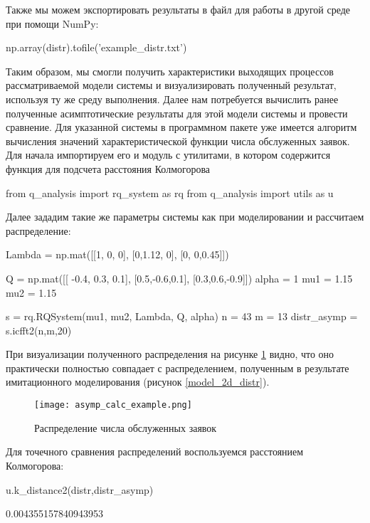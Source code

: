 Также мы можем экспортировать результаты в файл для работы в другой среде при помощи NumPy:
\begin{pyin} [rqtestchar]
np.array(distr).tofile('example_distr.txt')
\end{pyin}
Таким образом, мы смогли получить характеристики выходящих процессов рассматриваемой модели системы и визуализировать полученный результат, используя ту же среду выполнения. Далее нам потребуется вычислить ранее полученные асимптотические результаты для этой модели системы и провести сравнение. Для указанной системы в программном пакете уже имеется алгоритм вычисления значений характеристической функции числа обслуженных заявок. Для начала импортируем его и модуль с утилитами, в котором содержится функция для подсчета расстояния Колмогорова

\begin{pyin} 
from q_analysis import rq_system as rq
from q_analysis import utils as u
\end{pyin}

Далее зададим такие же параметры системы как при моделировании и рассчитаем распределение:

\begin{pyin} 
Lambda = np.mat([[1, 0,   0],
[0,1.12, 0],
[0, 0,0.45]])

Q = np.mat([[ -0.4, 0.3, 0.1],
[0.5,-0.6,0.1],
[0.3,0.6,-0.9]])
alpha = 1
mu1 = 1.15
mu2 = 1.15

s = rq.RQSystem(mu1, mu2, Lambda, Q, alpha)
n = 43
m = 13
distr_asymp =    s.icfft2(n,m,20)
\end{pyin}

При визуализации полученного распределения на рисунке \ref{asymp_calc_example} видно, что оно практически полностью совпадает с распределением, полученным в результате имитационного моделирования (рисунок \ref{model_2d_distr}).

\begin{figure}[H]
	\centering
	\texttt{[image: asymp\_calc\_example.png]}
	\caption{Распределение числа обслуженных заявок} 
	\label{asymp_calc_example}
\end{figure}

Для точечного сравнения распределений воспользуемся расстоянием Колмогорова:

\begin{pyin} 
u.k_distance2(distr,distr_asymp)
\end{pyin}

\begin{pyout} 
0.004355157840943953
\end{pyout}

